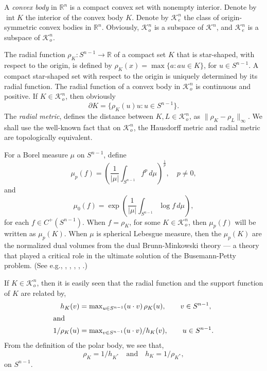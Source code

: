 \documentclass{cpamart1}     %
\theoremstyle{definition}
\theoremstyle{remark}
\newcommand{\ro}{\mathbb R}
\newcommand{\rn}{\mathbb R^n}
\newcommand{\sn}{S^{n-1}}
\newcommand{\kno}{\mathcal K^n_o}
\newcommand{\kne}{\mathcal K^n_e}
\DeclareMathOperator{\Int}{int}
\begin{document}
A {\it convex body} in $\rn$ is a compact convex set with nonempty interior.
Denote by $\Int K$ the interior of the convex body $K$.
Denote by $\kne$ the class of origin-symmetric convex bodies in $\rn$.
Obviously, $\kno$ is a subspace of $\mathcal K^n$, and $\kne$ is a subspace of
$\kno$.

The radial function $\rho_K:\sn \to \ro$ of a compact set $K$ that is star-shaped,
with respect to the origin, is defined by $\rho_K(x) = \max\{a : a u \in K\}$, for $u\in\sn$.
A compact star-shaped set with respect to the origin is uniquely determined
by its radial function.
The radial function of a convex body in $\kno$
is continuous and positive.  If $K\in\kno$, then obviously
\[
\partial K =\{\rho_K(u)u : u\in \sn\}.
\]
The {\it radial metric}, defines the distance between $K,L\in\kno$, as $\|\rho_K - \rho_L\|_\infty$.
We shall use the well-known fact that on $\kno$, the Hausdorff metric and radial
 metric are topologically equivalent.

For a Borel measure $\mu$ on $\sn$, define
\begin{equation*}
\mu_p(f) = \left(\frac 1{|\mu|} \int_{\sn} f^p \, d\mu\right)^\frac1p, \quad p\neq 0,
\end{equation*}
and
\begin{equation*}
\mu_0(f) = \exp \left(\frac 1{|\mu|} \int_{\sn} \log f \, d\mu\right),
\end{equation*}
for each $f\in C^+(\sn)$. When $f=\rho_K$, for some $K\in\kno$, then $\mu_p(f)$ will
be written as $\mu_p(K)$.
When $\mu$ is spherical Lebesgue measure, then the $\mu_p(K)$ are the normalized dual
volumes from the dual Brunn-Minkowski theory --- a theory that played a critical role
in the ultimate solution of the Busemann-Petty problem. (See e.g., \cite{G94ann},
\cite{GKS99ann}, \cite{K98ajm}, \cite{K00gafa}, \cite{Z99ann}.)




If $K\in \kno$, then it is easily seen that
the radial function and the support function of $K$ are related by,
\begin{align*}
h_K(v)        &= \max\nolimits_{u\in\sn}   (u\cdot v) \,\rho_K(u), \qquad v\in\sn,  \\
\shortintertext{and}
1/\rho_K(u) &=  \max\nolimits_{v\in\sn}  (u\cdot v)/h_K(v),  \qquad u\in\sn.
\end{align*}
From the definition of the polar body, we see that,
\begin{equation}\label{polar}
 \rho_K = 1/h_{K^*}\quad\text{and}\quad h_K= 1/\rho_{K^*},
\end{equation}
on $\sn$.
\end{document}
